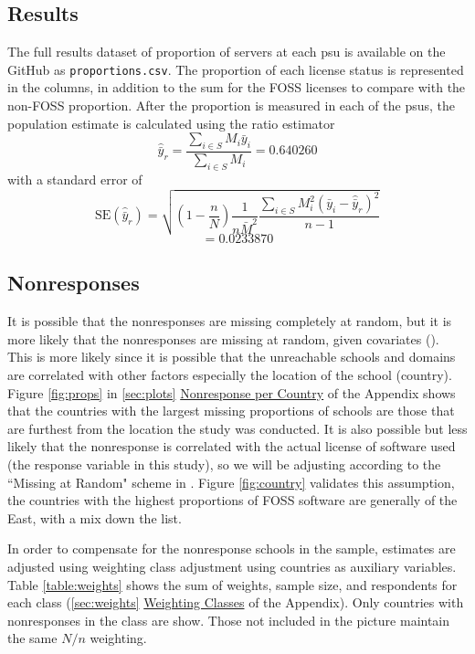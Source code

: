 \documentclass{article}
\theoremstyle{definition}
\begin{document}
\begin{flushleft}
\begin{multicols}{2}
\section{Results}
The full results dataset of proportion of servers at
each psu is available on the GitHub as \texttt{proportions.csv}.
The proportion of each license status is represented in the columns,
in addition to the sum for the FOSS licenses to compare with the
non-FOSS proportion. After the proportion is measured in each of
the psus, the population estimate is calculated using the
ratio estimator
$$
	\hat{\bar{y}}_r
	=
	\frac{
		\sum_{i \in S} M_i\bar{y}_i
	}{
		\sum_{i \in S} M_i
	}
	=
	0.640260
$$
with a standard error of
$$
	\textrm{SE}(\hat{\bar{y}}_r)
	=
	\sqrt{
		\left(
			1 - \frac{n}{N}
		\right)
		\frac{1}{n\bar{M}^2}
		\frac{
			\sum_{i \in S}M_i^2\left(\bar{y}_i-\hat{\bar{y}}_r\right)^2
		}{
			n-1
		}
	}
$$
$$
=
0.0233870
$$

\subsection{Nonresponses}
It is possible that the nonresponses are missing completely at random,
but it is more likely that the nonresponses are missing at random, given
covariates (\cite{lohr2019}). This is more likely since it is possible that
the unreachable schools and domains are correlated with other factors especially
the location of the school (country). Figure \ref{fig:props} in \autoref{sec:plots}
\hyperref[sec:plots]{Nonresponse per Country}
of the Appendix shows that the countries with the largest missing proportions
of schools are those that are furthest from the location the study was conducted.
It is also possible but less likely that
the nonresponse is correlated with the actual license of software used (the
response variable in this study), so we will be adjusting according to
the ``Missing at Random" scheme in \cite{lohr2019}. Figure \ref{fig:country}
validates this assumption, the countries with the highest proportions of
FOSS software are generally of the East, with a mix down the list.

In order to compensate for the nonresponse schools
in the sample, estimates are adjusted using weighting
class adjustment using countries as auxiliary variables. Table
\ref{table:weights} shows the
sum of weights, sample size, and respondents for each class
(\autoref{sec:weights} \hyperref[sec:weights]{Weighting Classes} of
the Appendix).
Only countries with nonresponses in the class are show.
Those not included in the picture maintain the same $N/n$ weighting.


\end{multicols}
\end{flushleft}
\end{document}
